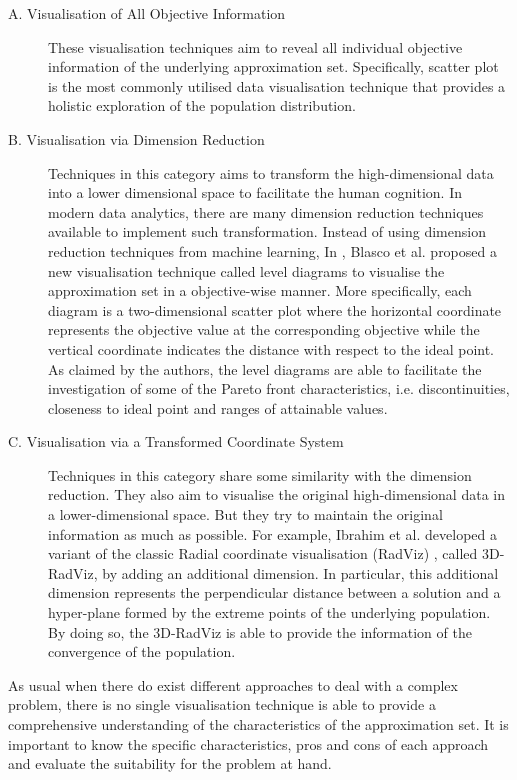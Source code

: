 \begin{description}
\item [A. Visualisation of All Objective Information] These visualisation techniques aim to reveal all individual objective information of the underlying approximation set. Specifically, scatter plot is the most commonly utilised data visualisation technique that provides a holistic exploration of the population distribution. 

\item [B. Visualisation via Dimension Reduction] Techniques in this category aims to transform the high-dimensional data into a lower dimensional space to facilitate the human cognition. In modern data analytics, there are many dimension reduction techniques available to implement such transformation.  Instead of using dimension reduction techniques from machine learning, In \cite{Blasco2008}, Blasco et al. proposed a new visualisation technique called level diagrams to visualise the approximation set in a objective-wise manner. More specifically, each diagram is a two-dimensional scatter plot where the horizontal coordinate represents the objective value at the corresponding objective while the vertical coordinate indicates the distance with respect to the ideal point. As claimed by the authors, the level diagrams are able to facilitate the investigation of some of the Pareto front characteristics, i.e. discontinuities, closeness to ideal point and ranges of attainable values. 

\item [C. Visualisation via a Transformed Coordinate System] Techniques in this category share some similarity with the dimension reduction. They also aim to visualise the original high-dimensional data in a lower-dimensional space. But they try to maintain the original information as much as possible. For example, Ibrahim et al. \cite{Ibrahim2016} developed a variant of the classic Radial coordinate visualisation (RadViz) \cite{Hoffman2002}, called 3D-RadViz, by adding an additional dimension. In particular, this additional dimension represents the perpendicular distance between a solution and a hyper-plane formed by the extreme points of the underlying population. By doing so, the 3D-RadViz is able to provide the information of the convergence of the population. 
\end{description}

As usual when there do exist different approaches to deal with a complex problem, there is  no single visualisation technique is able to provide a comprehensive understanding of the characteristics of the approximation set. It is important to know the specific characteristics, pros and cons of each approach and evaluate the suitability for the problem at hand.
  
